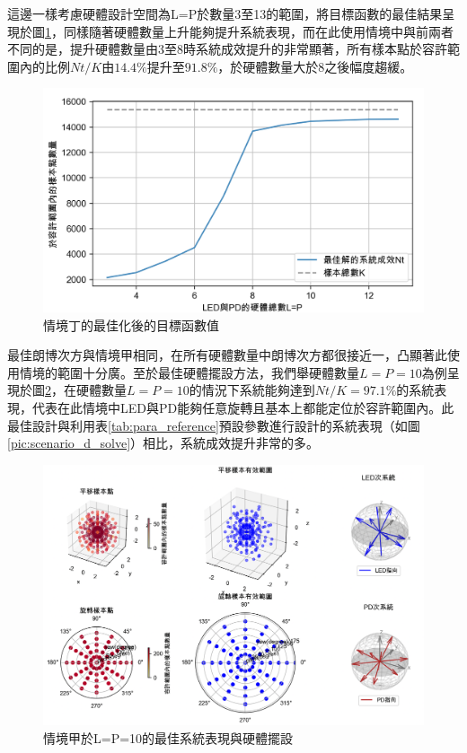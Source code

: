    這邊一樣考慮硬體設計空間為L=P於數量3至13的範圍，將目標函數的最佳結果呈現於圖\ref{pic:opt_D}，同樣隨著硬體數量上升能夠提升系統表現，而在此使用情境中與前兩者不同的是，提升硬體數量由3至8時系統成效提升的非常顯著，所有樣本點於容許範圍內的比例$Nt/K$由$14.4\%$提升至$91.8\%$，於硬體數量大於8之後幅度趨緩。

    \begin{figure}[htpb]
        \centering
        \includegraphics[width=13cm]{ch5pic/optimize_d.png}
        \caption{情境丁的最佳化後的目標函數值}
        \label{pic:opt_D}
    \end{figure}

    最佳朗博次方與情境甲相同，在所有硬體數量中朗博次方都很接近一，凸顯著此使用情境的範圍十分廣。至於最佳硬體擺設方法，我們舉硬體數量$L=P=10$為例呈現於圖\ref{pic:d_1010}，在硬體數量$L=P=10$的情況下系統能夠達到$Nt/K=97.1\%$的系統表現，代表在此情境中LED與PD能夠任意旋轉且基本上都能定位於容許範圍內。此最佳設計與利用表\ref{tab:para_reference}預設參數進行設計的系統表現（如圖\ref{pic:scenario_d_solve}）相比，系統成效提升非常的多。

    \begin{figure}[htpb]
        \centering
        \includegraphics[width=15cm]{ch5pic/d_1010.png}
        \caption{情境甲於L=P=10的最佳系統表現與硬體擺設}
        \label{pic:d_1010}
    \end{figure}

